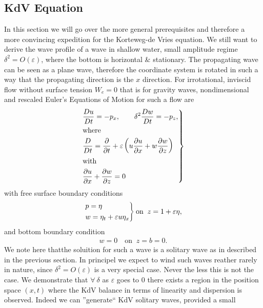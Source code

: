 \subsection{KdV Equation}
In this section we will go over the more general prerequisites and therefore
a more convincing expedition for the Korteweg-de Vries equation. We still
want to derive the wave profile of a wave in shallow water, small amplitude
regime $\delta^2 = O(\varepsilon)$, where the bottom is horizontal \&
stationary. The propagating wave can be seen as a plane wave, therefore the
coordinate system is rotated in such a way that the propagating direction is
the $x$ direction. For irrotational, inviscid flow without surface tension
$W_e=0$ that is for gravity waves, nondimensional and rescaled Euler's
Equations of Motion for such a flow are
\begin{align}
    \begin{drcases}
        \frac{Du}{Dt}=-p_x,\quad \quad \delta^2
        \frac{Dw}{Dt} = -p_z,\\
    \text{where}\\
    \frac{D}{Dt} = \frac{\partial }{\partial t}  + \varepsilon
    \left(
    u\frac{\partial u}{\partial x}
    +w\frac{\partial w}{\partial z}\right)
\\
    \text{with}\\
    \frac{\partial u}{\partial x} +\frac{\partial w}{\partial z}  = 0
    \end{drcases}
\end{align}
with free surface boundary conditions
\begin{align}
    \begin{drcases}
        p=\eta\\
        w=\eta_t+\varepsilon u \eta_x
    \end{drcases}
    \text{on}\;\; z= 1+\varepsilon\eta,
\end{align}
and bottom boundary condition
\begin{align}
    w = 0 \quad \text{on}\;\; z=b =0.
\end{align}
We note here thatthe soluition for such a wave is a solitary wave as in
described in the previous section. In principel we expect to wind such waves
reather rarely in nature, since $\delta^2 = O(\varepsilon)$ is a very special
case. Never the less this is not the case. We demonstrate that $\forall\
\delta$ as $\varepsilon$ goes to $0$ there exists a region in the position
space $(x, t)$ where the KdV balance in terms of linearity and dispersion
is observed. Indeed we can ''generate`` KdV solitary waves, provided a small
